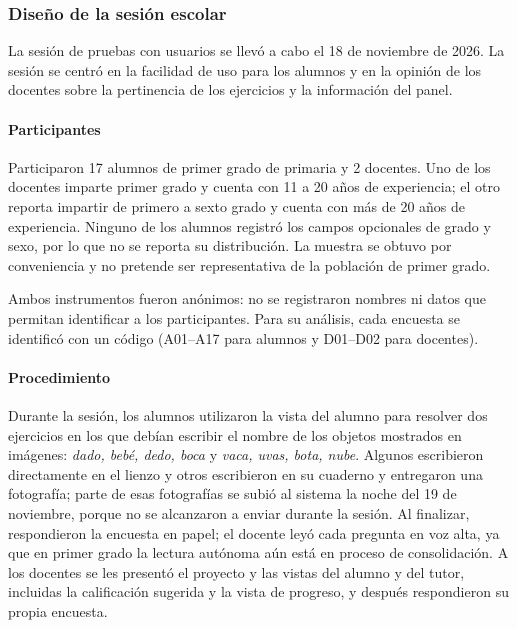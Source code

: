 \subsubsection{Diseño de la sesión escolar}
\label{sec:diseno-pruebas}

La sesión de pruebas con usuarios se llevó a cabo el 18 de noviembre de 2026. %
La sesión se centró en la facilidad de uso para los alumnos y en la opinión de los docentes sobre la pertinencia de los ejercicios y la información del panel.

\paragraph{Participantes}
Participaron 17 alumnos de primer grado de primaria y 2 docentes. Uno de los docentes imparte primer grado y cuenta con 11 a 20 años de experiencia; el otro reporta impartir de primero a sexto grado y cuenta con más de 20 años de experiencia. Ninguno de los alumnos registró los campos opcionales de grado y sexo, por lo que no se reporta su distribución. La muestra se obtuvo por conveniencia y no pretende ser representativa de la población de primer grado.

Ambos instrumentos fueron anónimos: no se registraron nombres ni datos que permitan identificar a los participantes. Para su análisis, cada encuesta se identificó con un código (A01--A17 para alumnos y D01--D02 para docentes).

\paragraph{Procedimiento}
Durante la sesión, los alumnos utilizaron la vista del alumno para resolver dos ejercicios en los que debían escribir el nombre de los objetos mostrados en imágenes: \textit{dado, bebé, dedo, boca} y \textit{vaca, uvas, bota, nube}. Algunos escribieron directamente en el lienzo y otros escribieron en su cuaderno y entregaron una fotografía; parte de esas fotografías se subió al sistema la noche del 19 de noviembre, porque no se alcanzaron a enviar durante la sesión. %
Al finalizar, respondieron la encuesta en papel; el docente leyó cada pregunta en voz alta, ya que en primer grado la lectura autónoma aún está en proceso de consolidación. A los docentes se les presentó el proyecto y las vistas del alumno y del tutor, incluidas la calificación sugerida y la vista de progreso, y después respondieron su propia encuesta.

